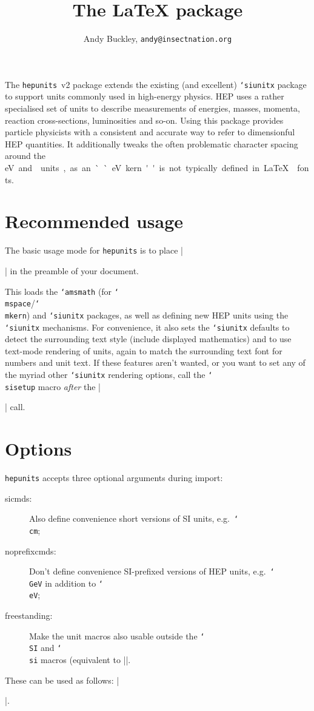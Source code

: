 \documentclass[12pt]{article}
\author{Andy Buckley, \texttt{andy@insectnation.org}}
\title{The \hepunits \LaTeX{} package}
\newcommand{\hepunits}{\texttt{hepunits}\xspace}
\newcommand{\texcmd}[1]{\texttt{\char`\\#1}}
\newcommand{\texpkg}[1]{\texttt{\char`#1}}
\newenvironment{snippet}{\Verbatim}{\endVerbatim}
\begin{document}
\maketitle


The \hepunits~v2 package extends the existing (and excellent) \texpkg{siunitx}
package to support units commonly used in high-energy physics. HEP uses a
rather specialised set of units to describe measurements of energies, masses,
momenta, reaction cross-sections, luminosities and so-on. Using this package
provides particle physicists with a consistent and accurate way to refer to
dimensionful HEP quantities. It additionally tweaks the often problematic
character spacing around the \si\eV and \si\eVcsq units, as an ``eV kern''
is not typically defined in \LaTeX{} fonts. %


\section{Recommended usage}
The basic usage mode for \hepunits is to place |\usepackage{hepunits}|
in the preamble of your document.

This loads the \texpkg{amsmath} (for \texcmd{mspace}/\texcmd{mkern}) and
\texpkg{siunitx} packages, as well as defining new HEP units using the
\texpkg{siunitx} mechanisms. For convenience, it also sets the \texpkg{siunitx}
defaults to detect the surrounding text style (include displayed mathematics)
and to use text-mode rendering of units, again to match the surrounding text
font for numbers and unit text. If these features aren't wanted, or you want to
set any of the myriad other \texpkg{siunitx} rendering options, call the
\texcmd{sisetup} macro \emph{after} the |\usepackage{hepunits}| call.


\section{Options}
\hepunits accepts three optional arguments during import:
%
\begin{description}
\item[sicmds:] Also define convenience short versions of SI units, e.g.~\texcmd{cm};
\item[noprefixcmds:] Don't define convenience SI-prefixed versions of HEP units, e.g.~\texcmd{GeV} in addition to \texcmd{eV};
\item[freestanding:] Make the unit macros also usable outside the \texcmd{SI} and \texcmd{si} macros (equivalent to ||.
\end{description}
%
These can be used as follows: |\usepackage[sicmds,freestanding]{heputils}|.
\end{document}
